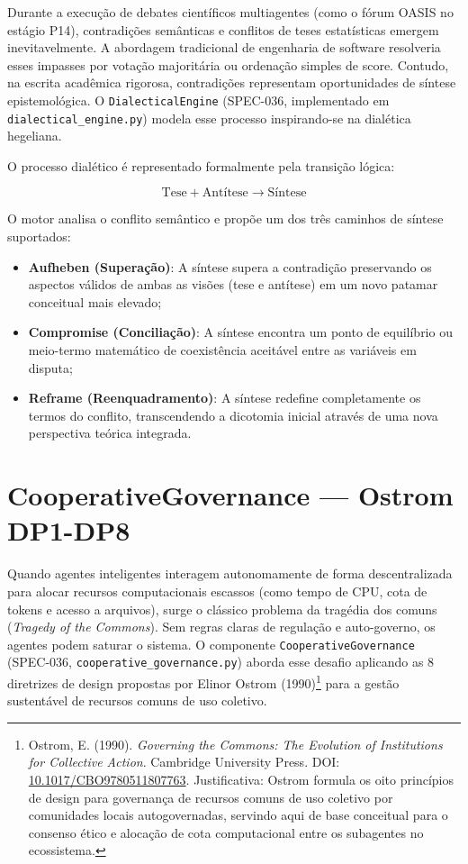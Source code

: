 \documentclass[12pt,a4paper,oneside]{abntex2}
\begin{document}
Durante a execução de debates científicos multiagentes (como o fórum OASIS no estágio P14), contradições semânticas e conflitos de teses estatísticas emergem inevitavelmente. A abordagem tradicional de engenharia de software resolveria esses impasses por votação majoritária ou ordenação simples de score. Contudo, na escrita acadêmica rigorosa, contradições representam oportunidades de síntese epistemológica. O \texttt{DialecticalEngine} (SPEC-036, implementado em \texttt{dialectical\_engine.py}) modela esse processo inspirando-se na dialética hegeliana.

O processo dialético é representado formalmente pela transição lógica:

\begin{equation}
\text{Tese} + \text{Antítese} \rightarrow \text{Síntese}
\end{equation}

O motor analisa o conflito semântico e propõe um dos três caminhos de síntese suportados:

\begin{itemize}
    \item \textbf{Aufheben (Superação)}: A síntese supera a contradição preservando os aspectos válidos de ambas as visões (tese e antítese) em um novo patamar conceitual mais elevado;
    \item \textbf{Compromise (Conciliação)}: A síntese encontra um ponto de equilíbrio ou meio-termo matemático de coexistência aceitável entre as variáveis em disputa;
    \item \textbf{Reframe (Reenquadramento)}: A síntese redefine completamente os termos do conflito, transcendendo a dicotomia inicial através de uma nova perspectiva teórica integrada.
\end{itemize}

\section{CooperativeGovernance — Ostrom DP1-DP8}

Quando agentes inteligentes interagem autonomamente de forma descentralizada para alocar recursos computacionais escassos (como tempo de CPU, cota de tokens e acesso a arquivos), surge o clássico problema da tragédia dos comuns (\textit{Tragedy of the Commons}). Sem regras claras de regulação e auto-governo, os agentes podem saturar o sistema. O componente \texttt{CooperativeGovernance} (SPEC-036, \texttt{cooperative\_governance.py}) aborda esse desafio aplicando as 8 diretrizes de design propostas por Elinor Ostrom (1990)\footnote{Ostrom, E. (1990). \textit{Governing the Commons: The Evolution of Institutions for Collective Action}. Cambridge University Press. DOI: \href{https://doi.org/10.1017/CBO9780511807763}{10.1017/CBO9780511807763}. Justificativa: Ostrom formula os oito princípios de design para governança de recursos comuns de uso coletivo por comunidades locais autogovernadas, servindo aqui de base conceitual para o consenso ético e alocação de cota computacional entre os subagentes no ecossistema.} para a gestão sustentável de recursos comuns de uso coletivo.
\end{document}
